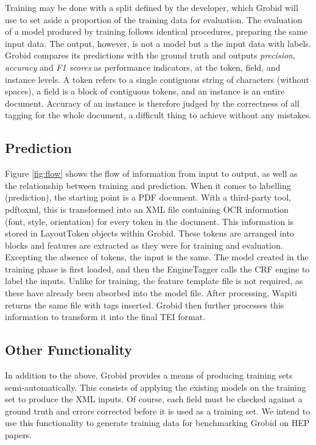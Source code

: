 Training may be done with a split defined by the developer, which Grobid will use to set aside a proportion of the training data for evaluation. The evaluation of a model produced by training follows identical procedures, preparing the same input data. The output, however, is not a model but a the input data with labels. Grobid compares its predictions with the ground truth and outputs \emph{precision}, \emph{accuracy} and \emph{F1 scores} as performance indicators, at the token, field, and instance levels. A token refers to a single contiguous string of characters (without spaces), a field is a block of contiguous tokens, and an instance is an entire document. Accuracy of an instance is therefore judged by the correctness of all tagging for the whole document, a difficult thing to achieve without any mistakes.

\subsection{Prediction}

Figure \ref{fig:flow} shows the flow of information from input to output, as well as the relationship between training and prediction. When it comes to labelling (prediction), the starting point is a PDF document. With a third-party tool, pdftoxml, this is transformed into an XML file containing OCR information (font, style, orientation) for every token in the document. This information is stored in LayoutToken objects within Grobid. These tokens are arranged into blocks and features are extracted as they were for training and evaluation. Excepting the absence of tokens, the input is the same. The model created in the training phase is first loaded, and then the EngineTagger calls the CRF engine to label the inputs. Unlike for training, the feature template file is not required, as these have already been absorbed into the model file. After processing, Wapiti returns the same file with tags inserted. Grobid then further processes this information to transform it into the final TEI format.

\subsection{Other Functionality}

In addition to the above, Grobid provides a means of producing training sets semi-automatically. This consists of applying the existing models on the training set to produce the XML inputs. Of course, each field must be checked against a ground truth and errors corrected before it is used as a training set. We intend to use this functionality to generate training data for benchmarking Grobid on HEP papers.

